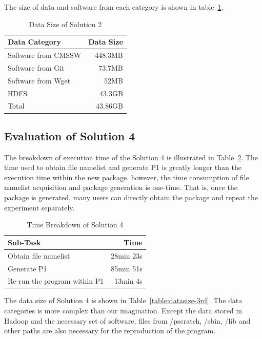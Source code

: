 \documentclass{acm_proc_article-sp}
\begin{document}
The size of data and software from each category is shown in table~\ref{table:datasize-2nd}.

\begin{table}
    \centering
    \begin{tabular}{|l|r|}
    \hline
    Data Category & Data Size \\ \hline
    Software from CMSSW & 448.3MB \\ \hline
    Software from Git & 73.7MB \\ \hline
    Software from Wget & 52MB \\ \hline
    HDFS & 43.3GB \\ \hline
    Total & 43.86GB \\ \hline
    \end{tabular}
    \caption{Data Size of Solution 2}
    \label{table:datasize-2nd}
\end{table}

\subsection{Evaluation of Solution 4}
The breakdown of execution time of the Solution 4 is illustrated in Table~\ref{table:time-3rd}. The time used to obtain file namelist and generate P1 is greatly longer than the execution time within the new package. however, the time consumption of file namelist acquisition and package generation is one-time. That is, once the package is generated, many users can directly obtain the package and repeat the experiment separately. 

\begin{table}
    \centering
    \begin{tabular}{|l|r|}
    \hline
    Sub-Task & Time \\ \hline
    Obtain file namelist & 28min 23s \\ \hline
    Generate P1 & 85min 51s \\ \hline
    Re-run the program within P1 & 13min 4s \\ \hline
    \end{tabular}
    \caption{Time Breakdown of Solution 4}
    \label{table:time-3rd}
\end{table}

The data size of Solution 4 is shown in Table~\ref{table:datasize-3rd}. The
data categories is more complex than our imagination. Except the data stored in
Hadoop and the necessary set of software, files from /pscratch, /sbin, /lib and other
paths are also necessary for the reproduction of the program.
\end{document}
